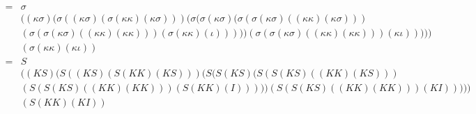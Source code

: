 \documentclass[11pt,oneside,a4paper]{report}
\begin{document}
\begin{align}
    =&\sigma  \tag*{} \\
    &((\kappa \sigma) (\sigma ((\kappa \sigma) (\sigma (\kappa \kappa) (\kappa \sigma))) (\sigma (\sigma (\kappa \sigma) (\sigma (\sigma (\kappa \sigma) ((\kappa \kappa) (\kappa \sigma))) \tag*{} \\
    &(\sigma (\sigma (\kappa \sigma) ((\kappa \kappa) (\kappa \kappa))) (\sigma (\kappa \kappa) (\iota))))) (\sigma (\sigma (\kappa \sigma) ((\kappa \kappa) (\kappa \kappa))) (\kappa \iota))))) \tag*{} \\
    &(\sigma (\kappa \kappa) (\kappa \iota)) \tag*{} \\
    =&S  \tag*{} \\
    &((K S) (S ((K S) (S (K K) (K S))) (S (S (K S) (S (S (K S) ((K K) (K S))) \tag*{} \\
    &(S (S (K S) ((K K) (K K))) (S (K K) (I))))) (S (S (K S) ((K K) (K K))) (K I))))) \tag*{} \\
    &(S (K K) (K I)) \tag*{} \\
\end{align}
\end{document}

